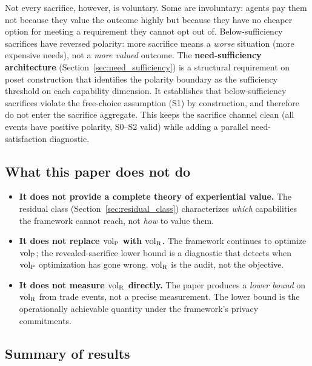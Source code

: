 Not every sacrifice, however, is voluntary.  Some are
involuntary: agents pay them not because they value the outcome
highly but because they have no cheaper option for meeting a
requirement they cannot opt out of.  Below-sufficiency sacrifices
have reversed polarity: more sacrifice means a \emph{worse}
situation (more expensive needs), not a \emph{more valued}
outcome.  The \textbf{need-sufficiency architecture}
(Section~\ref{sec:need_sufficiency}) is a structural requirement
on poset construction that identifies the polarity boundary as
the sufficiency threshold on each capability dimension.  It
establishes that below-sufficiency sacrifices violate the
free-choice assumption (S1) by construction, and therefore do
not enter the sacrifice aggregate.  This keeps the sacrifice
channel clean (all events have positive polarity, S0--S2 valid)
while adding a parallel need-satisfaction diagnostic.

\subsection{What this paper does not do}
\label{sec:not_do}

\begin{itemize}
\item
\textbf{It does not provide a complete theory of experiential
value.}  The residual class (Section~\ref{sec:residual_class})
characterizes \emph{which} capabilities the framework cannot
reach, not \emph{how} to value them.

\item
\textbf{It does not replace ${\operatorname{vol}_{\mathrm{P}}}$ with ${\operatorname{vol}_{\mathrm{R}}}$.}  The framework
continues to optimize ${\operatorname{vol}_{\mathrm{P}}}$; the revealed-sacrifice lower bound
is a diagnostic that detects when ${\operatorname{vol}_{\mathrm{P}}}$ optimization has gone
wrong.  ${\operatorname{vol}_{\mathrm{R}}}$ is the audit, not the objective.

\item
\textbf{It does not measure ${\operatorname{vol}_{\mathrm{R}}}$ directly.}  The paper produces
a \emph{lower bound} on ${\operatorname{vol}_{\mathrm{R}}}$ from trade events, not a precise
measurement.  The lower bound is the operationally achievable
quantity under the framework's privacy commitments.
\end{itemize}

\subsection{Summary of results}

